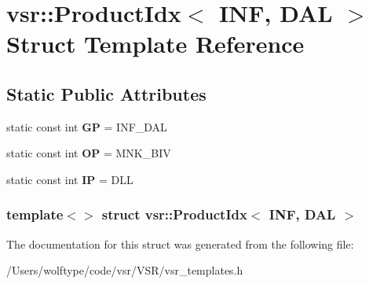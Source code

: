 \hypertarget{structvsr_1_1_product_idx_3_01_i_n_f_00_01_d_a_l_01_4}{\section{vsr\-:\-:Product\-Idx$<$ I\-N\-F, D\-A\-L $>$ Struct Template Reference}
\label{structvsr_1_1_product_idx_3_01_i_n_f_00_01_d_a_l_01_4}
}
\subsection*{Static Public Attributes}
\begin{DoxyCompactItemize}
\item 
\hypertarget{structvsr_1_1_product_idx_3_01_i_n_f_00_01_d_a_l_01_4_a5bc3e0e54ed3632cc3d478a59054cc44}{static const int {\bfseries G\-P} = I\-N\-F\-\_\-\-D\-A\-L}\label{structvsr_1_1_product_idx_3_01_i_n_f_00_01_d_a_l_01_4_a5bc3e0e54ed3632cc3d478a59054cc44}

\item 
\hypertarget{structvsr_1_1_product_idx_3_01_i_n_f_00_01_d_a_l_01_4_afc5eb52d677d9b3f84194e6d5ad4e715}{static const int {\bfseries O\-P} = M\-N\-K\-\_\-\-B\-I\-V}\label{structvsr_1_1_product_idx_3_01_i_n_f_00_01_d_a_l_01_4_afc5eb52d677d9b3f84194e6d5ad4e715}

\item 
\hypertarget{structvsr_1_1_product_idx_3_01_i_n_f_00_01_d_a_l_01_4_a48d2e099c7eebda3b7cc3fc3fa2bb000}{static const int {\bfseries I\-P} = D\-L\-L}\label{structvsr_1_1_product_idx_3_01_i_n_f_00_01_d_a_l_01_4_a48d2e099c7eebda3b7cc3fc3fa2bb000}

\end{DoxyCompactItemize}
\subsubsection*{template$<$$>$ struct vsr\-::\-Product\-Idx$<$ I\-N\-F, D\-A\-L $>$}



The documentation for this struct was generated from the following file\-:\begin{DoxyCompactItemize}
\item 
/\-Users/wolftype/code/vsr/\-V\-S\-R/vsr\-\_\-templates.\-h\end{DoxyCompactItemize}

